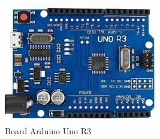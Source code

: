 \begin{figure}[H]
    \centering
    \includegraphics{Images/ArduinoUno.jpg}
    \caption{Board Arduino Uno R3}
    \label{fig:arduino}
\end{figure}
